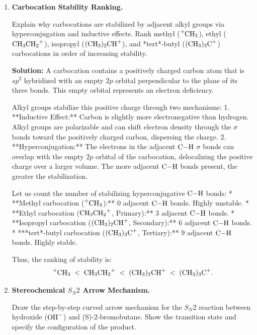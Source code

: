 \documentclass[12pt, a4paper]{book}
\begin{document}
\begin{problembox}
\begin{enumerate}[label=\textbf{E\arabic*.}]
  \item \textbf{Carbocation Stability Ranking.}
  
        Explain why carbocations are stabilized by adjacent alkyl groups via hyperconjugation and inductive effects. Rank methyl ($\ce{^+CH3}$), ethyl ($\ce{CH3CH2^+}$), isopropyl ($\ce{(CH3)2CH^+}$), and *tert*-butyl ($\ce{(CH3)3C^+}$) carbocations in order of increasing stability.
        
        \textbf{Solution:}
        A carbocation contains a positively charged carbon atom that is $sp^2$ hybridized with an empty $2p$ orbital perpendicular to the plane of its three bonds. This empty orbital represents an electron deficiency.
        
        Alkyl groups stabilize this positive charge through two mechanisms:
        1. **Inductive Effect:** Carbon is slightly more electronegative than hydrogen. Alkyl groups are polarizable and can shift electron density through the $\sigma$ bonds toward the positively charged carbon, dispersing the charge.
        2. **Hyperconjugation:** The electrons in the adjacent $\ce{C-H}$ $\sigma$ bonds can overlap with the empty $2p$ orbital of the carbocation, delocalizing the positive charge over a larger volume. The more adjacent $\ce{C-H}$ bonds present, the greater the stabilization.
        
        Let us count the number of stabilizing hyperconjugative $\ce{C-H}$ bonds:
        * **Methyl carbocation ($\ce{^+CH3}$):** 0 adjacent $\ce{C-H}$ bonds. Highly unstable.
        * **Ethyl carbocation ($\ce{CH3CH2^+}$, Primary):** 3 adjacent $\ce{C-H}$ bonds.
        * **Isopropyl carbocation ($\ce{(CH3)2CH^+}$, Secondary):** 6 adjacent $\ce{C-H}$ bonds.
        * ***tert*-butyl carbocation ($\ce{(CH3)3C^+}$, Tertiary):** 9 adjacent $\ce{C-H}$ bonds. Highly stable.
        
        Thus, the ranking of stability is:
        \[
          \ce{^+CH3} \;<\; \ce{CH3CH2^+} \;<\; \ce{(CH3)2CH^+} \;<\; \ce{(CH3)3C^+}.
        \]
        
  \item \textbf{Stereochemical $S_N2$ Arrow Mechanism.}
  
        Draw the step-by-step curved arrow mechanism for the $S_N2$ reaction between hydroxide ($\ce{OH-}$) and (S)-2-bromobutane. Show the transition state and specify the configuration of the product.
        

\end{enumerate}
\end{problembox}
\end{document}

